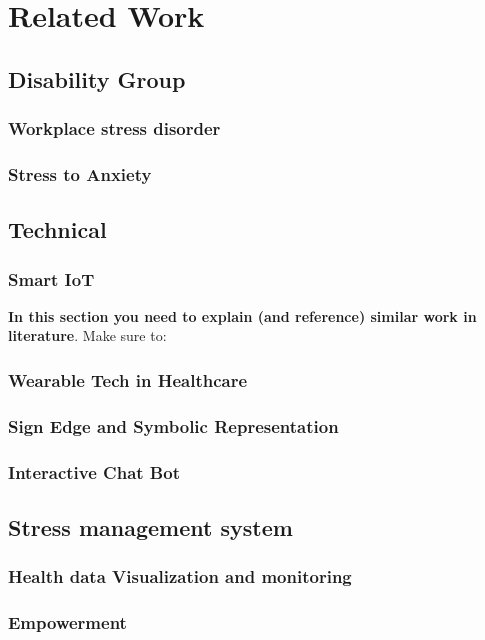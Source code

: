 \chapter{Related Work}

\section{Disability Group}
\subsection{Workplace stress disorder}
\subsection{Stress to Anxiety}
\section{Technical}
\subsection{Smart IoT}
\textbf{In this section you need to explain (and reference) similar work in literature}.  Make sure to:
\subsection{Wearable Tech in Healthcare}
\subsection{Sign Edge and Symbolic Representation}
\subsection{Interactive Chat Bot}
\section{Stress management system}
\subsection{Health data Visualization and monitoring}
\subsection{Empowerment}

